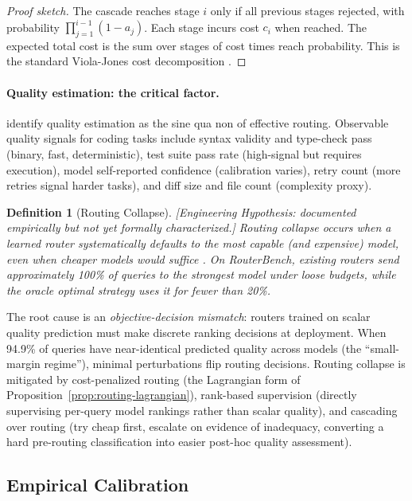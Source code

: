 \documentclass[11pt, a4paper]{googledeepmind}
\newtheorem{definition}{Definition}[section]
\begin{document}
\begin{proof}[Proof sketch]
The cascade reaches stage $i$ only if all previous stages rejected, with probability $\prod_{j=1}^{i-1}(1 - a_j)$. Each stage incurs cost $c_i$ when reached. The expected total cost is the sum over stages of cost times reach probability. This is the standard Viola-Jones cost decomposition \citep{violajones2004}.
\end{proof}

\paragraph{Quality estimation: the critical factor.} \citet{dekoninck2025cascade} identify quality estimation as the sine qua non of effective routing. Observable quality signals for coding tasks include syntax validity and type-check pass (binary, fast, deterministic), test suite pass rate (high-signal but requires execution), model self-reported confidence (calibration varies), retry count (more retries signal harder tasks), and diff size and file count (complexity proxy).

\begin{definition}[Routing Collapse]
\emph{[Engineering Hypothesis: documented empirically but not yet formally characterized.]}
\label{def:routing-collapse}
\emph{Routing collapse} occurs when a learned router systematically defaults to the most capable (and expensive) model, even when cheaper models would suffice \citep{routingcollapse2026}. On RouterBench, existing routers send approximately 100\% of queries to the strongest model under loose budgets, while the oracle optimal strategy uses it for fewer than 20\%.
\end{definition}

The root cause is an \emph{objective-decision mismatch}: routers trained on scalar quality prediction must make discrete ranking decisions at deployment. When 94.9\% of queries have near-identical predicted quality across models (the ``small-margin regime''), minimal perturbations flip routing decisions. Routing collapse is mitigated by cost-penalized routing (the Lagrangian form of Proposition~\ref{prop:routing-lagrangian}), rank-based supervision (directly supervising per-query model rankings rather than scalar quality), and cascading over routing (try cheap first, escalate on evidence of inadequacy, converting a hard pre-routing classification into easier post-hoc quality assessment).

\subsection{Empirical Calibration}
\end{document}
